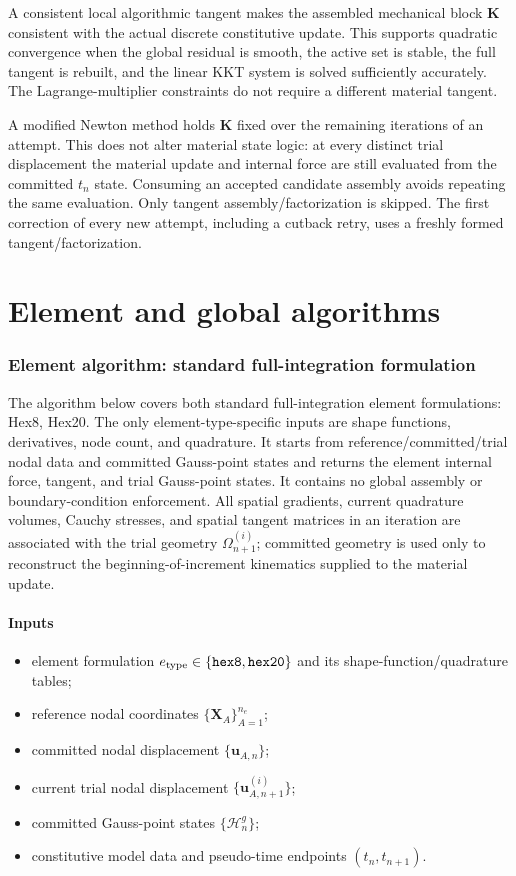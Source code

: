\documentclass[11pt,a4paper]{article}
\newcommand{\bs}[1]{\boldsymbol{#1}}
\newcommand{\vct}[1]{\mathbf{#1}}
\begin{document}
A consistent local algorithmic tangent makes the assembled mechanical block $\vct K$ consistent with the actual discrete constitutive update. This supports quadratic convergence when the global residual is smooth, the active set is stable, the full tangent is rebuilt, and the linear KKT system is solved sufficiently accurately. The Lagrange-multiplier constraints do not require a different material tangent.

A modified Newton method holds $\vct K$ fixed over the remaining iterations of an attempt. This does not alter material state logic: at every distinct trial displacement the material update and internal force are still evaluated from the committed $t_n$ state. Consuming an accepted candidate assembly avoids repeating the same evaluation. Only tangent assembly/factorization is skipped. The first correction of every new attempt, including a cutback retry, uses a freshly formed tangent/factorization.



\part{Element and global algorithms}
\section{Element algorithm: standard full-integration formulation}
\label{sec:algo-T}

The algorithm below covers both standard full-integration element formulations: Hex8, Hex20. The only element-type-specific inputs are shape functions, derivatives, node count, and quadrature. It starts from reference/committed/trial nodal data and committed Gauss-point states and returns the element internal force, tangent, and trial Gauss-point states. It contains no global assembly or boundary-condition enforcement. All spatial gradients, current quadrature volumes, Cauchy stresses, and spatial tangent matrices in an iteration are associated with the trial geometry $\Omega_{n+1}^{(i)}$; committed geometry is used only to reconstruct the beginning-of-increment kinematics supplied to the material update.

\subsection*{Inputs}
\begin{itemize}
    \item element formulation $e_{\rm type}\in\{\texttt{hex8},\texttt{hex20}\}$ and its shape-function/quadrature tables;
    \item reference nodal coordinates $\{\bs{X}_A\}_{A=1}^{n_e}$;
    \item committed nodal displacement $\{\bs{u}_{A,n}\}$;
    \item current trial nodal displacement $\{\bs{u}_{A,n+1}^{(i)}\}$;
    \item committed Gauss-point states $\{\mathcal{H}_n^g\}$;
    \item constitutive model data and pseudo-time endpoints $(t_n,t_{n+1})$.
\end{itemize}
\end{document}
